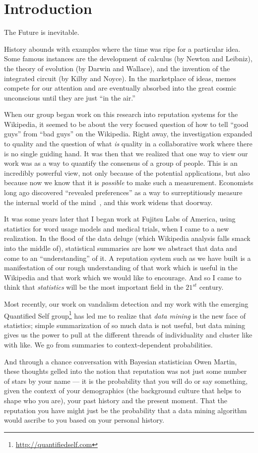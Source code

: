\section{Introduction}

The Future is inevitable.

History abounds with examples where the time was ripe for a particular idea.
Some famous instances are the development of calculus (by Newton and Leibniz),
the theory of evolution (by Darwin and Wallace), and the invention of
the integrated circuit (by Kilby and Noyce).
In the marketplace of ideas, memes compete for our attention and
are eventually absorbed into the great cosmic unconscious until
they are just ``in the air.''

When our group began work on this research into reputation systems for
the Wikipedia, it seemed to be about the very focused
question of how to tell ``good guys'' from ``bad guys'' on the Wikipedia.
Right away, the investigation expanded to quality and the question of what
\textit{is} quality in a collaborative work where there is no single
guiding hand.
It was then that we realized that one way to view our work was as a
way to quantify the consensus of a group of people.
This is an incredibly powerful view, not only because of the potential
applications, but also because now we know that it is \textit{possible}
to make such a measurement.
Economists long ago discovered ``revealed preferences''
as a way to surreptitiously measure the internal world of the
mind~\cite{Samuelson1938,Varian2006}, and this work widens that doorway.

It was some years later that I began work at Fujitsu Labs of America,
using statistics for word usage models and medical trials,
when I came to a new realization.
In the flood of the data deluge (which Wikipedia analysis falls smack
into the middle of), statistical summaries are how we abstract that data
and come to an ``understanding'' of it.
A reputation system such as we have built is a manifestation of our
rough understanding of that work which is useful in the Wikipedia and
that work which we would like to encourage.
And so I came to think that \textit{statistics} will be the
most important field in the $21^{st}$ century.

Most recently, our work on vandalism detection and my work with the
emerging Quantified Self group\footnote{\url{http://quantifiedself.com}}
has led me to realize that
\textit{data mining} is the new face of statistics; simple summarization
of so much data is not useful, but data mining gives us the power to
pull at the different threads of individuality and cluster like with like.
We go from summaries to context-dependent probabilities.

And through a chance conversation with Bayesian statistician
Owen Martin, these thoughts gelled into the notion that reputation
was not just some number of stars by your name --- it is the probability
that you will do or say something, given the context of your demographics
(\ie the background culture that helps to shape who you are),
your past history and the present moment.
That the reputation you have might just be the probability
that a data mining algorithm would ascribe to you based on your personal history.

